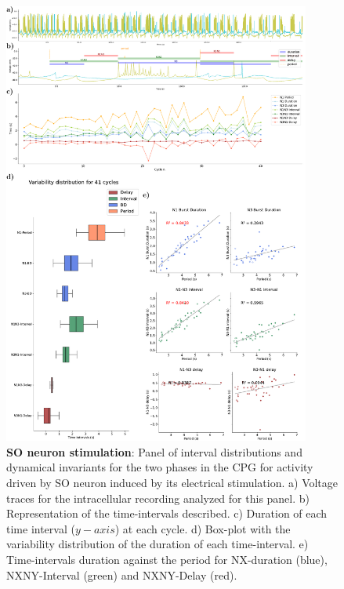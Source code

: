 \begin{figure}[htbp]
	\centering
	\includegraphics[width=0.9\textwidth]{./img/invariants/data/SUSSEX/SO_driven/images/panel_with_intervals.pdf}
	\caption{\textbf{SO neuron stimulation}: Panel of interval distributions and dynamical invariants for the two phases in the CPG for activity driven by SO neuron induced by its electrical stimulation. a) Voltage traces for the intracellular recording analyzed for this panel. b) Representation of the time-intervals described. c) Duration of each time interval ($y-axis$) at each cycle. d) Box-plot with the variability distribution of the duration of each time-interval. e) Time-intervals duration against the period for NX-duration (blue), NXNY-Interval (green) and NXNY-Delay (red).}
	\label{fig:so induced invariants}
\end{figure}


